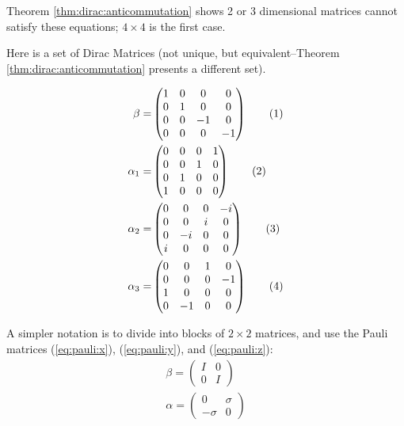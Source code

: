 \documentclass[]{article}
\newcommand\numberthis{\addtocounter{equation}{1}\tag{\theequation}}
\begin{document}
Theorem \ref{thm:dirac:anticommutation} shows 2 or 3 dimensional matrices cannot satisfy these equations; $4 \times 4$ is the first case.

Here is a set of Dirac Matrices (not unique, but equivalent--Theorem \ref{thm:dirac:anticommutation} presents a different set).

\begin{align*}
	\beta =& \begin{pmatrix}
		1&0&0&0\\
		0&1&0&0\\
		0&0&-1&0\\
		0&0&0&-1
	\end{pmatrix} \numberthis \label{eq:beta:1}\\
	\alpha_1 =& \begin{pmatrix}
		0&0&0&1\\
		0&0&1&0\\
		0&1&0&0\\
		1&0&0&0
	\end{pmatrix}\numberthis \label{eq:alpha1:1}\\ 
	\alpha_2 =& \begin{pmatrix}
		0&0&0&-i\\
		0&0&i&0\\
		0&-i&0&0\\
		i&0&0&0
	\end{pmatrix} \numberthis \label{eq:alpha2:1} \\ 
	\alpha_3 =& \begin{pmatrix}
		0&0&1&0\\
		0&0&0&-1\\
		1&0&0&0\\
		0&-1&0&0 
	\end{pmatrix} \numberthis \label{eq:alpha3:1}
\end{align*}

A simpler notation is to divide into blocks of $2\times 2$ matrices, and use the Pauli matrices (\ref{eq:pauli:x}), (\ref{eq:pauli:y}), and (\ref{eq:pauli:z}):
\begin{align*}
	\beta = \begin{pmatrix}
		I&0\\
		0&I
	\end{pmatrix}\\
	\alpha = \begin{pmatrix}
		0&\sigma\\
		-\sigma&0
	\end{pmatrix}
\end{align*}
\end{document}

